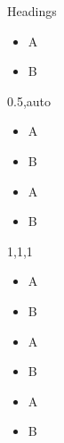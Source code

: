 \documentclass[english,aspectratio=169,t,9pt]{beamer}
\begin{document}
\begin{frame}{Headings}
	\begin{itemize}
	\item A
	\item B
	\end{itemize}

	\vspace{\bigskipamount}

	\begin{cols}{0.5,auto}
		\begin{itemize}
		\item A
		\item B
		\end{itemize}
	\col
		\begin{itemize}
		\item A
		\item B
		\end{itemize}
	\end{cols}

	\vspace{\bigskipamount}

	\begin{cols}{1,1,1}
		\begin{itemize}
		\item A
		\item B
		\end{itemize}
	\col
		\begin{itemize}
		\item A
		\item B
		\end{itemize}
	\col
		\begin{itemize}
		\item A
		\item B
		\end{itemize}
	\end{cols}
\end{frame}
\end{document}
